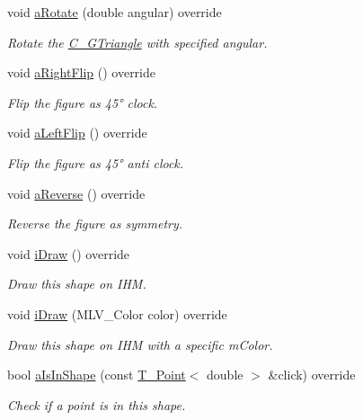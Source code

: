 \begin{DoxyCompactItemize}
void \hyperlink{classC__GTriangle_a29c641aea4ef5fa4224b42dffc5fefa5}{a\+Rotate} (double angular) override
\begin{DoxyCompactList}\small\item\em Rotate the \hyperlink{classC__GTriangle}{C\+\_\+\+G\+Triangle} with specified angular. \end{DoxyCompactList}\item 
void \hyperlink{classC__GTriangle_aa4f808a02ae18bd36c205a5d70eb3fef}{a\+Right\+Flip} () override
\begin{DoxyCompactList}\small\item\em Flip the figure as 45° clock. \end{DoxyCompactList}\item 
void \hyperlink{classC__GTriangle_a9ffdddb586b42757ffca6a9ca0c20934}{a\+Left\+Flip} () override
\begin{DoxyCompactList}\small\item\em Flip the figure as 45° anti clock. \end{DoxyCompactList}\item 
void \hyperlink{classC__GTriangle_a479646fa1265aaf2299b59787c394a27}{a\+Reverse} () override
\begin{DoxyCompactList}\small\item\em Reverse the figure as symmetry. \end{DoxyCompactList}\item 
void \hyperlink{classC__GTriangle_a53abbd8cd622323fc2f3b80ce91cfde9}{i\+Draw} () override
\begin{DoxyCompactList}\small\item\em Draw this shape on I\+HM. \end{DoxyCompactList}\item 
void \hyperlink{classC__GTriangle_a9cfd20cb1d19e6c92bd217c470c86405}{i\+Draw} (M\+L\+V\+\_\+\+Color color) override
\begin{DoxyCompactList}\small\item\em Draw this shape on I\+HM with a specific m\+Color. \end{DoxyCompactList}\item 
bool \hyperlink{classC__GTriangle_a417b28c74dd35f81a19b5bd1d214ba8d}{a\+Is\+In\+Shape} (const \hyperlink{classT__Point}{T\+\_\+\+Point}$<$ double $>$ \&click) override
\begin{DoxyCompactList}\small\item\em Check if a point is in this shape. \end{DoxyCompactList}\item 

\end{DoxyCompactItemize}
